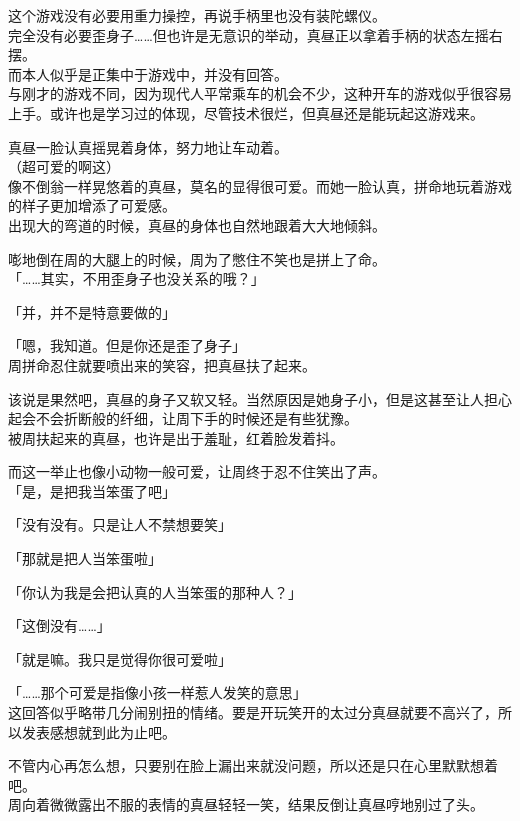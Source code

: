 这个游戏没有必要用重力操控，再说手柄里也没有装陀螺仪。\\

完全没有必要歪身子……但也许是无意识的举动，真昼正以拿着手柄的状态左摇右摆。\\

而本人似乎是正集中于游戏中，并没有回答。\\

与刚才的游戏不同，因为现代人平常乘车的机会不少，这种开车的游戏似乎很容易上手。或许也是学习过的体现，尽管技术很烂，但真昼还是能玩起这游戏来。

真昼一脸认真摇晃着身体，努力地让车动着。\\

（超可爱的啊这）\\

像不倒翁一样晃悠着的真昼，莫名的显得很可爱。而她一脸认真，拼命地玩着游戏的样子更加增添了可爱感。\\

出现大的弯道的时候，真昼的身体也自然地跟着大大地倾斜。

嘭地倒在周的大腿上的时候，周为了憋住不笑也是拼上了命。\\

「……其实，不用歪身子也没关系的哦？」

「并，并不是特意要做的」

「嗯，我知道。但是你还是歪了身子」\\

周拼命忍住就要喷出来的笑容，把真昼扶了起来。

该说是果然吧，真昼的身子又软又轻。当然原因是她身子小，但是这甚至让人担心起会不会折断般的纤细，让周下手的时候还是有些犹豫。\\

被周扶起来的真昼，也许是出于羞耻，红着脸发着抖。

而这一举止也像小动物一般可爱，让周终于忍不住笑出了声。\\

「是，是把我当笨蛋了吧」

「没有没有。只是让人不禁想要笑」

「那就是把人当笨蛋啦」

「你认为我是会把认真的人当笨蛋的那种人？」

「这倒没有……」

「就是嘛。我只是觉得你很可爱啦」

「……那个可爱是指像小孩一样惹人发笑的意思」\\

这回答似乎略带几分闹别扭的情绪。要是开玩笑开的太过分真昼就要不高兴了，所以发表感想就到此为止吧。

不管内心再怎么想，只要别在脸上漏出来就没问题，所以还是只在心里默默想着吧。\\

周向着微微露出不服的表情的真昼轻轻一笑，结果反倒让真昼哼地别过了头。
